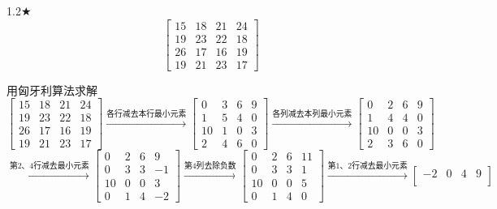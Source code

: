 \begin{problem}{1.2$\bigstar$}
    $$\begin{bmatrix}
        15 & 18 & 21 & 24\\
        19 & 23 & 22 & 18\\
        26 & 17 & 16 & 19\\
        19 & 21 & 23 & 17
    \end{bmatrix}$$
\end{problem}
\begin{solution}
    用匈牙利算法求解
    $$\begin{bmatrix}
        15 & 18 & 21 & 24\\
        19 & 23 & 22 & 18\\
        26 & 17 & 16 & 19\\
        19 & 21 & 23 & 17
    \end{bmatrix}
    \xrightarrow{\text{各行减去本行最小元素}}
    \begin{bmatrix}
        0  & 3  & 6  & 9 \\
        1  & 5  & 4  & 0 \\
        10 & 1  & 0  & 3 \\
        2  & 4  & 6  & 0
    \end{bmatrix}
    \xrightarrow{\text{各列减去本列最小元素}}
    \begin{bmatrix}
        0  & 2  & 6  & 9 \\
        1  & 4  & 4  & 0 \\
        10 & 0  & 0  & 3 \\
        2  & 3  & 6  & 0
    \end{bmatrix}$$
    $$
    \xrightarrow{\text{第2、4行减去最小元素}}
    \begin{bmatrix}
        0  & 2  & 6  & 9 \\
        0  & 3  & 3  & -1\\
        10 & 0  & 0  & 3 \\
        0  & 1  & 4  & -2
    \end{bmatrix}
    \xrightarrow{\text{第4列去除负数}}
    \begin{bmatrix}
        0  & 2  & 6  & 11\\
        0  & 3  & 3  & 1 \\
        10 & 0  & 0  & 5 \\
        0  & 1  & 4  & 0
    \end{bmatrix}
    \xrightarrow{\text{第1、2行减去最小元素}}
    \begin{bmatrix}
        -2 & 0  & 4  & 9 \\

\end{bmatrix}$$
\end{solution}
